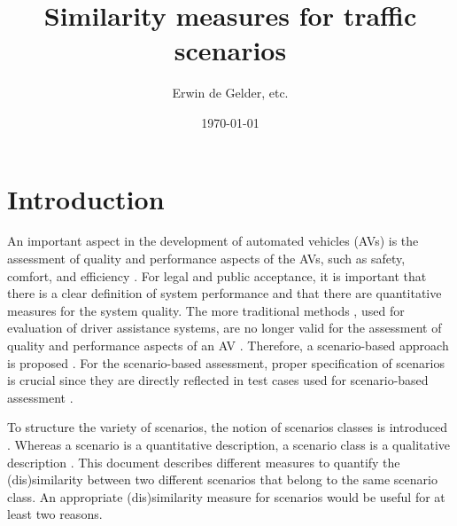 \documentclass[10pt,final,a4paper,oneside,onecolumn]{article}
\def\reptitle{Similarity measures for traffic scenarios}
\def\repauthor{Erwin de Gelder, etc.}
\theoremstyle{plain}\newtheorem{definition}{Definition}[section]    %
\theoremstyle{definition}\newtheorem{example}{Example}[section]     %
\theoremstyle{remark}\newtheorem{remarkenv}{Remark}[section]        %
\begin{document}

\title{\textbf{\reptitle}}
\author{\repauthor}
\date{\today}
\maketitle

\tableofcontents

\newpage

\section{Introduction}
\label{sec:introduction}
An important aspect in the development of automated vehicles (AVs) is the assessment of quality and performance aspects of the AVs, such as safety, comfort, and efficiency \cite{bengler2014threedecades, stellet2015taxonomy, wachenfeld2016release, putz2017pegasus, roesener2016scenariobased, kompass2015sicherheitsveranderung}. 
For legal and public acceptance, it is important that there is a clear definition of system performance and that there are quantitative measures for the system quality. 
The more traditional methods \cite{response2006code, ISO26262}, used for evaluation of driver assistance systems, are no longer valid for the assessment of quality and performance aspects of an AV \cite{wachenfeld2016release}. 
Therefore, a scenario-based approach is proposed \cite{roesener2016scenariobased, putz2017pegasus, kompass2015sicherheitsveranderung}. 
For the scenario-based assessment, proper specification of scenarios is crucial since they are directly reflected in test cases used for scenario-based assessment \cite{stellet2015taxonomy}.

To structure the variety of scenarios, the notion of scenarios classes is introduced \cite{degelder2018ontology}. Whereas a scenario is a quantitative description, a scenario class is a qualitative description \cite{degelder2018ontology}. This document describes different measures to quantify the (dis)similarity between two different scenarios that belong to the same scenario class. An appropriate (dis)similarity measure for scenarios would be useful for at least two reasons.
\end{document}
